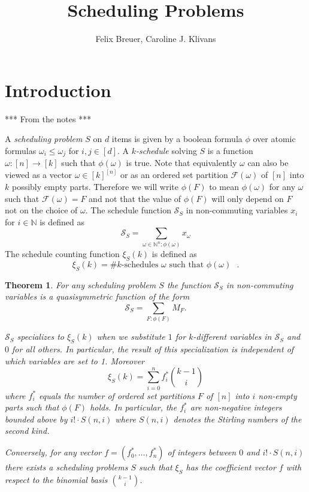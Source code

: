 \documentclass[11pt,letter]{amsart}
\title{Scheduling Problems}
\author{Felix Breuer, Caroline J. Klivans}
\newtheorem{theorem}[definition]{Theorem}
\newcommand{\NN}{\mathbb{N}}
\newcommand{\SSS}{\mathcal{S}}
\newcommand{\FFF}{\mathcal{F}}
\newcommand{\defn}[1]{\emph{#1}}
\begin{document}
\maketitle



\section{Introduction}

*** From the notes ***

A \defn{scheduling problem} $S$ on $d$ items is given by a boolean formula $\phi$ over atomic formulas $\omega_i\leq \omega_j$ for $i,j\in[d]$. A \defn{$k$-schedule} solving $S$ is a function $\omega:[n]\rightarrow[k]$ such that $\phi(\omega)$ is true. Note that equivalently $\omega$ can also be viewed as a vector $\omega\in [k]^{[n]}$ or as an ordered set partition $\FFF(\omega)$ of $[n]$ into $k$ possibly empty parts. Therefore we will write $\phi(F)$ to mean $\phi(\omega)$ for any $\omega$ such that $\FFF(\omega)=F$ and not that the value of $\phi(F)$ will only depend on $F$ not on the choice of $\omega$. The schedule function $\SSS_S$ in non-commuting variables $x_i$ for $i\in \NN$ is defined as
\[
  \SSS_S = \sum_{\omega\in \NN^n: \phi(\omega) } x_\omega
\] 
The schedule counting function $\xi_S(k)$ is defined as
\[
  \xi_S(k) = \# \text{$k$-schedules $\omega$ such that $\phi(\omega)$ }.
\]

\begin{theorem}
For any scheduling problem $S$ the function $\SSS_S$ in non-commuting variables is a quasisymmetric function of the form
\[
  \SSS_S = \sum_{F: \phi(F)} M_F.
\]

$\SSS_S$ specializes to $\xi_S(k)$ when we substitute $1$ for $k$-different variables in $\SSS_S$ and $0$ for all others. In particular, the result of this specialization is independent of which variables are set to 1. Moreover
\[
  \xi_S(k) = \sum_{i=0}^n f_i^* \binom{k-1}{i}
\]
where $f_i^*$ equals the number of ordered set partitions $F$ of $[n]$ into $i$ non-empty parts such that $\phi(F)$ holds. In particular, the $f_i^*$ are non-negative integers bounded above by $i!\cdot S(n,i)$ where $S(n,i)$ denotes the Stirling numbers of the second kind.

Conversely, for any vector $f=(f_0^*,\ldots,f_n^*)$ of integers between $0$ and $i!\cdot S(n,i)$ there exists a scheduling problems $S$ such that $\xi_S$ has the coefficient vector $f$ with respect to the binomial basis $\binom{k-1}{i}$.
\end{theorem}
\end{document}
